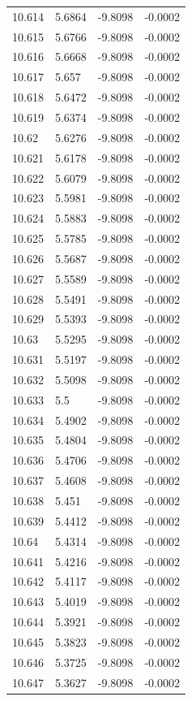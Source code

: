\begin{tabular}{llll}
10.614 & 5.6864 & -9.8098 & -0.0002 \\
10.615 & 5.6766 & -9.8098 & -0.0002 \\
10.616 & 5.6668 & -9.8098 & -0.0002 \\
10.617 & 5.657 & -9.8098 & -0.0002 \\
10.618 & 5.6472 & -9.8098 & -0.0002 \\
10.619 & 5.6374 & -9.8098 & -0.0002 \\
10.62 & 5.6276 & -9.8098 & -0.0002 \\
10.621 & 5.6178 & -9.8098 & -0.0002 \\
10.622 & 5.6079 & -9.8098 & -0.0002 \\
10.623 & 5.5981 & -9.8098 & -0.0002 \\
10.624 & 5.5883 & -9.8098 & -0.0002 \\
10.625 & 5.5785 & -9.8098 & -0.0002 \\
10.626 & 5.5687 & -9.8098 & -0.0002 \\
10.627 & 5.5589 & -9.8098 & -0.0002 \\
10.628 & 5.5491 & -9.8098 & -0.0002 \\
10.629 & 5.5393 & -9.8098 & -0.0002 \\
10.63 & 5.5295 & -9.8098 & -0.0002 \\
10.631 & 5.5197 & -9.8098 & -0.0002 \\
10.632 & 5.5098 & -9.8098 & -0.0002 \\
10.633 & 5.5 & -9.8098 & -0.0002 \\
10.634 & 5.4902 & -9.8098 & -0.0002 \\
10.635 & 5.4804 & -9.8098 & -0.0002 \\
10.636 & 5.4706 & -9.8098 & -0.0002 \\
10.637 & 5.4608 & -9.8098 & -0.0002 \\
10.638 & 5.451 & -9.8098 & -0.0002 \\
10.639 & 5.4412 & -9.8098 & -0.0002 \\
10.64 & 5.4314 & -9.8098 & -0.0002 \\
10.641 & 5.4216 & -9.8098 & -0.0002 \\
10.642 & 5.4117 & -9.8098 & -0.0002 \\
10.643 & 5.4019 & -9.8098 & -0.0002 \\
10.644 & 5.3921 & -9.8098 & -0.0002 \\
10.645 & 5.3823 & -9.8098 & -0.0002 \\
10.646 & 5.3725 & -9.8098 & -0.0002 \\
10.647 & 5.3627 & -9.8098 & -0.0002 \\

\end{tabular}

